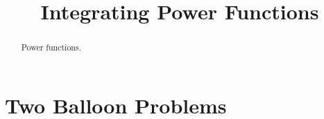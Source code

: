 \documentclass{ximera}
\title{Integrating Power Functions}
\begin{document}
\begin{abstract}
Power functions.
\end{abstract}
\maketitle


\section{Two Balloon Problems}
\end{document}
